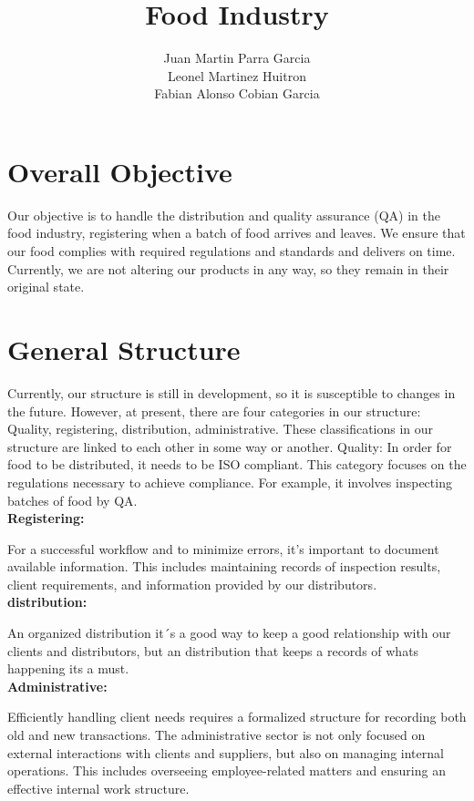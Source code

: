 \documentclass{article}
\title{Food Industry}
\author
{ 
    Juan Martin Parra Garcia \\
    Leonel Martinez Huitron \\
    Fabian Alonso Cobian Garcia
}
\begin{document}
\maketitle

\begin{abstract}

\end{abstract}

\section{Overall Objective}

Our objective is to handle the distribution and quality assurance (QA) in the food industry, registering when a batch of food arrives and leaves. We ensure that our food complies with required regulations and standards and delivers on time. 
Currently, we are not altering our products in any way, so they remain in their original state.


\section{General Structure}


Currently, our structure is still in development, so it is susceptible to changes in the future. However, at present, there are four categories in our structure:
Quality, registering, distribution, administrative.
These classifications in our structure are linked to each other in some way or another.
Quality:
In order for food to be distributed, it needs to be ISO compliant. This category focuses on the regulations necessary to achieve compliance. For example, it involves inspecting batches of food by QA. 
\\
\textbf{Registering:}

For a successful workflow and to minimize errors, it's important to document available information.
This includes maintaining records of inspection results, client requirements, and information provided by our distributors.
\\
\textbf{distribution:}

An organized distribution it´s a good way to keep a good relationship with our clients and distributors, but an distribution that keeps a records of whats happening its a must.
\\
\textbf{Administrative:}

Efficiently handling client needs requires a formalized structure for recording both old and new transactions. The administrative sector is not only focused on external interactions with clients and suppliers, but also on managing internal operations. This includes overseeing employee-related matters and ensuring an effective internal work structure.
\end{document}
